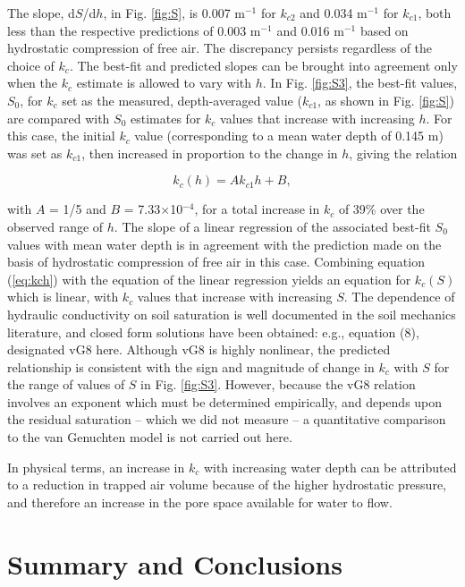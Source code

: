 The slope, d$S$/d$h$, in Fig. \ref{fig:S}, is 0.007 m$^{-1}$ for $k_{c2}$ and 0.034 m$^{-1}$ for $k_{c1}$, both less than the respective predictions of 0.003 m$^{-1}$ and 0.016 m$^{-1}$ based on hydrostatic compression of free air. The discrepancy persists regardless of the choice of $k_c$. The best-fit and predicted slopes can be brought into agreement only when the $k_c$ estimate is allowed to vary with $h$. In Fig. \ref{fig:S3}, the best-fit values, $S_{0}$, for $k_c$ set as the measured, depth-averaged value ($k_{c1}$, as shown in Fig. \ref{fig:S}) are compared with $S_0$ estimates for $k_c$ values that increase with increasing $h$. For this case, the initial $k_c$ value (corresponding to a mean water depth of 0.145 m) was set as $k_{c1}$, then increased in proportion to the change in $h$, giving the relation 

\begin{equation}\label{eq:kch}
k_c(h) = A k_{c1}h + B,
\end{equation}

\noindent with $A$ = 1/5 and $B$ = 7.33$\times$10$^{-4}$, for a total increase in $k_c$ of 39\% over the observed range of $h$. The slope of a linear regression of the associated best-fit $S_0$ values with mean water depth is in agreement with the prediction made on the basis of hydrostatic compression of free air in this case. Combining equation (\ref{eq:kch}) with the equation of the linear regression yields an equation for $k_c(S)$ which is linear, with $k_c$ values that increase with increasing $S$. The dependence of hydraulic conductivity on soil saturation is well documented in the soil mechanics literature, and closed form solutions have been obtained: e.g., \citet{vanGenuchten1980} equation (8), designated vG8 here. Although vG8 is highly nonlinear, the predicted relationship is consistent with the sign and magnitude of change in $k_c$ with $S$ for the range of values of $S$ in Fig. \ref{fig:S3}. However, because the vG8 relation involves an exponent which must be determined empirically, and depends upon the residual saturation -- which we did not measure -- a quantitative comparison to the van Genuchten model is not carried out here.

In physical terms, an increase in $k_c$ with increasing water depth can be attributed to a reduction in trapped air volume because of the higher hydrostatic pressure, and therefore an increase in the pore space available for water to flow.


\section{Summary and Conclusions}\label{ch1:Conclusions}


